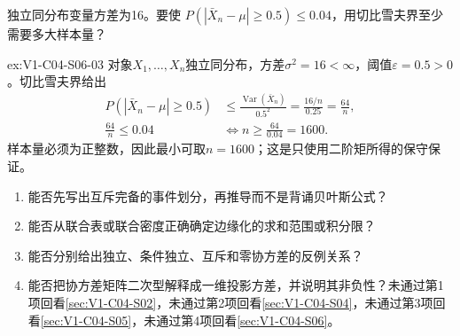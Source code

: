 \begin{SLChapterExercisePairSection}
\begin{exercise}\label{ex:V1-C04-S06-03}
独立同分布变量方差为16。要使 $P(|\bar X_n-\mu|\ge0.5)\le0.04$，用切比雪夫界至少需要多大样本量？
\end{exercise}
\label{sol:V1-C04-S06-03}
\begin{chapterexercisesolution}{ex:V1-C04-S06-03}
对象$X_1,\ldots,X_n$独立同分布，方差$\sigma^2=16<\infty$，阈值$\varepsilon=0.5>0$。切比雪夫界给出
\[
\begin{aligned}
P(|\bar X_n-\mu|\ge0.5)
&\le\frac{\operatorname{Var}(\bar X_n)}{0.5^2}
=\frac{16/n}{0.25}=\frac{64}{n},\\
\frac{64}{n}\le0.04
&\Longleftrightarrow n\ge\frac{64}{0.04}=1600.
\end{aligned}
\]
样本量必须为正整数，因此最小可取$n=1600$；这是只使用二阶矩所得的保守保证。
\end{chapterexercisesolution}

\end{SLChapterExercisePairSection}

\label{struct:V1-C04-CH36}
\begin{SLCompactClosure}

\label{struct:V1-C04-CH37}
\begin{selfcheckbox}
\begin{enumerate}[leftmargin=2.2em,nosep]
  \item 能否先写出互斥完备的事件划分，再推导而不是背诵贝叶斯公式？
  \item 能否从联合表或联合密度正确确定边缘化的求和范围或积分限？
  \item 能否分别给出独立、条件独立、互斥和零协方差的反例关系？
  \item 能否把协方差矩阵二次型解释成一维投影方差，并说明其非负性？未通过第1项回看\cref{sec:V1-C04-S02}，未通过第2项回看\cref{sec:V1-C04-S04}，未通过第3项回看\cref{sec:V1-C04-S05}，未通过第4项回看\cref{sec:V1-C04-S06}。
\end{enumerate}
\end{selfcheckbox}
\end{SLCompactClosure}
